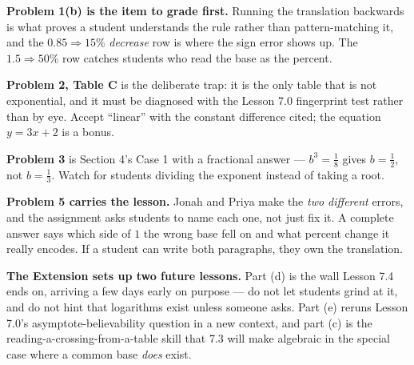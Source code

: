 \documentclass[10pt]{article}
\begin{document}
\begin{teachernote}
\textbf{Problem 1(b) is the item to grade first.} Running the translation backwards is what proves a
student understands the rule rather than pattern-matching it, and the $0.85 \Rightarrow 15\%$
\emph{decrease} row is where the sign error shows up. The $1.5 \Rightarrow 50\%$ row catches students
who read the base as the percent.

\textbf{Problem 2, Table C} is the deliberate trap: it is the only table that is not exponential, and
it must be diagnosed with the Lesson 7.0 fingerprint test rather than by eye. Accept ``linear'' with
the constant difference cited; the equation $y=3x+2$ is a bonus.

\textbf{Problem 3} is Section 4's Case 1 with a fractional answer --- $b^{3}=\frac18$ gives
$b=\frac12$, not $b=\frac13$. Watch for students dividing the exponent instead of taking a root.

\textbf{Problem 5 carries the lesson.} Jonah and Priya make the \emph{two different} errors, and the
assignment asks students to name each one, not just fix it. A complete answer says which side of $1$
the wrong base fell on and what percent change it really encodes. If a student can write both
paragraphs, they own the translation.

\textbf{The Extension sets up two future lessons.} Part (d) is the wall Lesson 7.4 ends on, arriving
a few days early on purpose --- do not let students grind at it, and do not hint that logarithms
exist unless someone asks. Part (e) reruns Lesson 7.0's asymptote-believability question in a new
context, and part (c) is the reading-a-crossing-from-a-table skill that 7.3 will make algebraic in
the special case where a common base \emph{does} exist.
\end{teachernote}
\end{document}
